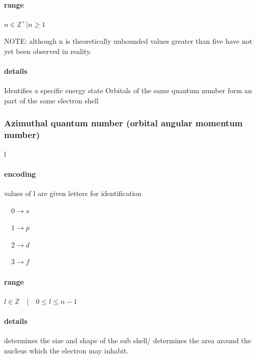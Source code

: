 \documentclass[]{article}
\let\oldparagraph\paragraph
\renewcommand{\paragraph}[1]{\oldparagraph{#1}\mbox{}}
\begin{document}
\hypertarget{range}{%
\paragraph{range}\label{range}}

\(n \in \mathbb{Z}^+| n \geq 1\)

NOTE: although n is theoretically unbounded values greater than five
have not yet been observed in reality.

\hypertarget{details}{%
\paragraph{details}\label{details}}

Identifies a specific energy state Orbitals of the same quantum number
form an part of the same electron shell

\hypertarget{azimuthal-quantum-number-orbital-angular-momentum-number}{%
\subsubsection{Azimuthal quantum number (orbital angular momentum
number)}\label{azimuthal-quantum-number-orbital-angular-momentum-number}}

l

\hypertarget{encoding}{%
\paragraph{encoding}\label{encoding}}

values of l are given letters for identification

\(\quad 0\rightarrow s\)

\(\quad 1\rightarrow p\)

\(\quad 2\rightarrow d\)

\(\quad 3\rightarrow f\)

\hypertarget{range-1}{%
\paragraph{range}\label{range-1}}

\(l\in \mathbb{Z}\quad | \quad 0 \leq l \leq n-1\quad\)

\hypertarget{details-1}{%
\paragraph{details}\label{details-1}}

determines the size and shape of the sub shell/ determines the area
around the nucleus which the electron may inhabit.
\end{document}
